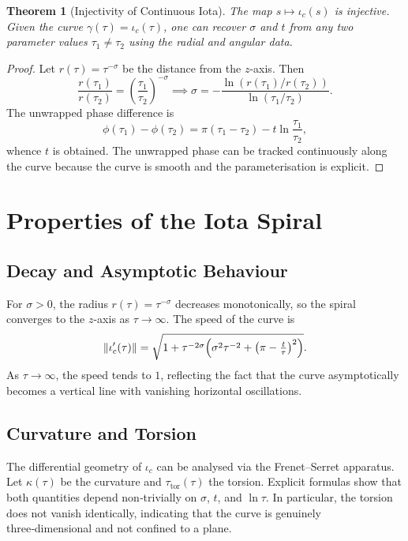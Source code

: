 \documentclass[11pt]{article}
\newtheorem{theorem}{Theorem}[section]
\begin{document}
\begin{theorem}[Injectivity of Continuous Iota]\label{thm:inj_cont}
  The map $s \mapsto \iota_c(s)$ is injective.  Given the curve $\gamma(\tau) = \iota_c(\tau)$, one can recover $\sigma$ and $t$ from any two parameter values $\tau_1 \neq \tau_2$ using the radial and angular data.
\end{theorem}
\begin{proof}
  Let $r(\tau) = \tau^{-\sigma}$ be the distance from the $z$-axis.  Then
  \[
    \frac{r(\tau_1)}{r(\tau_2)} = \left(\frac{\tau_1}{\tau_2}\right)^{-\sigma} \implies \sigma = -\frac{\ln(r(\tau_1)/r(\tau_2))}{\ln(\tau_1/\tau_2)}.
  \]
  The unwrapped phase difference is
  \[
    \phi(\tau_1) - \phi(\tau_2) = \pi(\tau_1-\tau_2) - t \ln\frac{\tau_1}{\tau_2},
  \]
  whence $t$ is obtained.  The unwrapped phase can be tracked continuously along the curve because the curve is smooth and the parameterisation is explicit.
\end{proof}

\section{Properties of the Iota Spiral}

\subsection{Decay and Asymptotic Behaviour}
For $\sigma > 0$, the radius $r(\tau) = \tau^{-\sigma}$ decreases monotonically, so the spiral converges to the $z$-axis as $\tau \to \infty$.  The speed of the curve is
\begin{equation}
  \|\iota_c'(\tau)\| = \sqrt{1 + \tau^{-2\sigma}\Bigl(\sigma^2\tau^{-2} + \bigl(\pi - \tfrac{t}{\tau}\bigr)^2\Bigr)}.
\end{equation}
As $\tau \to \infty$, the speed tends to $1$, reflecting the fact that the curve asymptotically becomes a vertical line with vanishing horizontal oscillations.

\subsection{Curvature and Torsion}
The differential geometry of $\iota_c$ can be analysed via the Frenet--Serret apparatus.  Let $\kappa(\tau)$ be the curvature and $\tau_{\text{tor}}(\tau)$ the torsion.  Explicit formulas show that both quantities depend non‑trivially on $\sigma$, $t$, and $\ln\tau$.  In particular, the torsion does not vanish identically, indicating that the curve is genuinely three‑dimensional and not confined to a plane.
\end{document}
